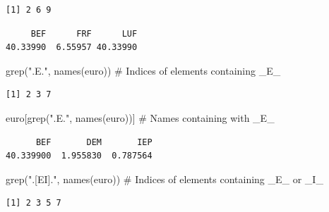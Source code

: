 \documentclass[
  letterpaper,
  DIV=11,
  numbers=noendperiod]{scrreprt}
\newenvironment{Shaded}{\begin{snugshade}}{\end{snugshade}}
\newcommand{\CommentTok}[1]{\textcolor[rgb]{0.37,0.37,0.37}{#1}}
\newcommand{\FunctionTok}[1]{\textcolor[rgb]{0.28,0.35,0.67}{#1}}
\newcommand{\NormalTok}[1]{\textcolor[rgb]{0.00,0.23,0.31}{#1}}
\newcommand{\StringTok}[1]{\textcolor[rgb]{0.13,0.47,0.30}{#1}}
\begin{document}
\begin{verbatim}
[1] 2 6 9
\end{verbatim}

\begin{Shaded}
\end{Shaded}

\begin{verbatim}
     BEF      FRF      LUF 
40.33990  6.55957 40.33990 
\end{verbatim}

\begin{Shaded}
\begin{Highlighting}[]
\FunctionTok{grep}\NormalTok{(}\StringTok{".E."}\NormalTok{, }\FunctionTok{names}\NormalTok{(euro)) }\CommentTok{\# Indices of elements containing \_E\_}
\end{Highlighting}
\end{Shaded}

\begin{verbatim}
[1] 2 3 7
\end{verbatim}

\begin{Shaded}
\begin{Highlighting}[]
\NormalTok{euro[}\FunctionTok{grep}\NormalTok{(}\StringTok{".E."}\NormalTok{, }\FunctionTok{names}\NormalTok{(euro))] }\CommentTok{\# Names containing with \_E\_}
\end{Highlighting}
\end{Shaded}

\begin{verbatim}
      BEF       DEM       IEP 
40.339900  1.955830  0.787564 
\end{verbatim}

\begin{Shaded}
\begin{Highlighting}[]
\FunctionTok{grep}\NormalTok{(}\StringTok{".[EI]."}\NormalTok{, }\FunctionTok{names}\NormalTok{(euro)) }\CommentTok{\# Indices of elements containing \_E\_ or \_I\_}
\end{Highlighting}
\end{Shaded}

\begin{verbatim}
[1] 2 3 5 7
\end{verbatim}
\end{document}
